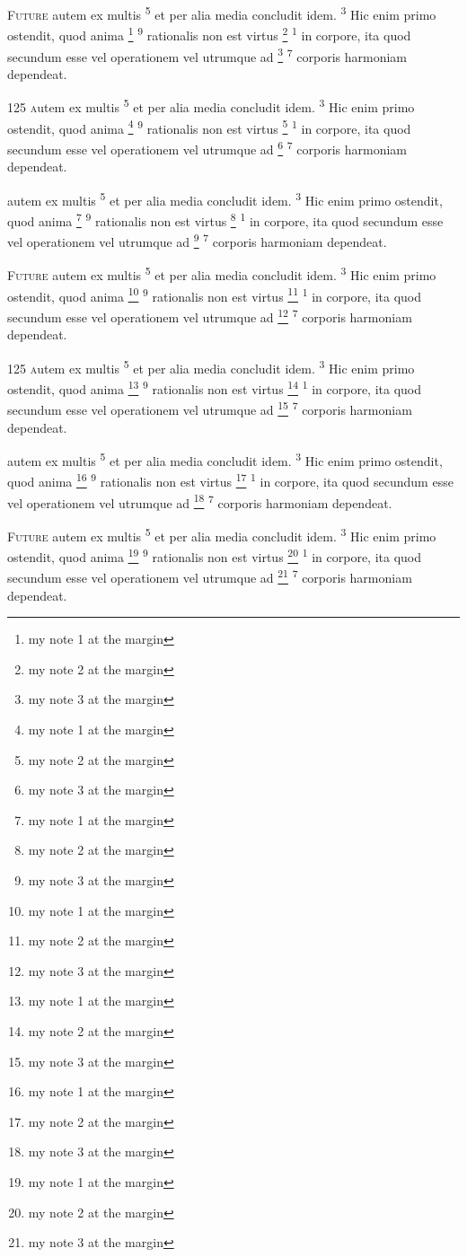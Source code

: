 \documentclass[twoside,12pt]{book}
\newcommand{\blGetVerse}[1]{%
\setcounter{footnote}{0}%
\textsuperscript{#1}%
}
\newcommand{\blGetVerseX}[2]{%
\footnote{#2}\blGetVerse{#1}%
}
\newcommand{\blIniChar}[1]{%
\blSetAcorn\selectfont{#1}%
}
\newcommand{\blIniWord}[1]{%
\blSetRothenburgDecorative\selectfont{#1}%
}
\newcommand{\blIniNum}[1]{%
\blSetDSRomantiques\selectfont{#1}%
}
\begin{document}
\lettrine{\blIniNum{150}}{Future}
autem ex multis \blGetVerse{5}et per alia media concludit idem. \blGetVerse{3}Hic enim primo ostendit, quod anima \blGetVerseX{9}{my note 1 at the margin}rationalis 
non est virtus \blGetVerseX{1}{my note 2 at the margin}in corpore, ita quod secundum esse vel
operationem vel utrumque ad \blGetVerseX{7}{my note 3 at the margin}corporis harmoniam dependeat.

\lettrine{125 }
autem ex multis \blGetVerse{5}et per alia media concludit idem. \blGetVerse{3}Hic enim primo ostendit, quod anima \blGetVerseX{9}{my note 1 at the margin}rationalis 
non est virtus \blGetVerseX{1}{my note 2 at the margin}in corpore, ita quod secundum esse vel
operationem vel utrumque ad \blGetVerseX{7}{my note 3 at the margin}corporis harmoniam dependeat.

\lettrine{\blIniChar{FU}}{\blIniWord{turo}}
autem ex multis \blGetVerse{5}et per alia media concludit idem. \blGetVerse{3}Hic enim primo ostendit, quod anima \blGetVerseX{9}{my note 1 at the margin}rationalis 
non est virtus \blGetVerseX{1}{my note 2 at the margin}in corpore, ita quod secundum esse vel
operationem vel utrumque ad \blGetVerseX{7}{my note 3 at the margin}corporis harmoniam dependeat.

\lettrine{\blIniNum{150}}{Future}
autem ex multis \blGetVerse{5}et per alia media concludit idem. \blGetVerse{3}Hic enim primo ostendit, quod anima \blGetVerseX{9}{my note 1 at the margin}rationalis 
non est virtus \blGetVerseX{1}{my note 2 at the margin}in corpore, ita quod secundum esse vel
operationem vel utrumque ad \blGetVerseX{7}{my note 3 at the margin}corporis harmoniam dependeat.

\lettrine{125 }
autem ex multis \blGetVerse{5}et per alia media concludit idem. \blGetVerse{3}Hic enim primo ostendit, quod anima \blGetVerseX{9}{my note 1 at the margin}rationalis 
non est virtus \blGetVerseX{1}{my note 2 at the margin}in corpore, ita quod secundum esse vel
operationem vel utrumque ad \blGetVerseX{7}{my note 3 at the margin}corporis harmoniam dependeat.

\lettrine{\blIniChar{FU}}{\blIniWord{turo}}
autem ex multis \blGetVerse{5}et per alia media concludit idem. \blGetVerse{3}Hic enim primo ostendit, quod anima \blGetVerseX{9}{my note 1 at the margin}rationalis 
non est virtus \blGetVerseX{1}{my note 2 at the margin}in corpore, ita quod secundum esse vel
operationem vel utrumque ad \blGetVerseX{7}{my note 3 at the margin}corporis harmoniam dependeat.

\lettrine{\blIniNum{150}}{Future}
autem ex multis \blGetVerse{5}et per alia media concludit idem. \blGetVerse{3}Hic enim primo ostendit, quod anima \blGetVerseX{9}{my note 1 at the margin}rationalis 
non est virtus \blGetVerseX{1}{my note 2 at the margin}in corpore, ita quod secundum esse vel
operationem vel utrumque ad \blGetVerseX{7}{my note 3 at the margin}corporis harmoniam dependeat.
\end{document}
